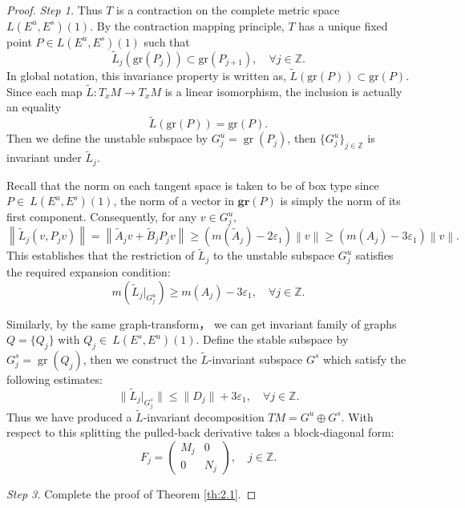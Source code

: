 \documentclass[12pt]{article}
\begin{document}
\begin{proof}{\em Step 1.}
	Thus $ T $ is a contraction on the complete metric space $ L(E^{u},E^{s})(1) $. By the contraction mapping principle, $ T $ has a unique fixed point $ P\in L(E^{u},E^{s})(1) $  such that
	$$
	\widetilde{L}_{j}(\text{gr}(P_{j}))\subset \text{gr}(P_{j+1}), \quad \forall j\in \mathbb Z.
	$$
	In global notation, this invariance property is written as, $ \widetilde{L}(\text{gr}(P))\subset \text{gr}(P) $. Since each map $ \widetilde{L}:T_{x}M \rightarrow T_{x}M $ is a linear isomorphism,
	the inclusion is actually an equality
	$$
	\widetilde{L}(\text{gr}(P))= \text{gr}(P).
	$$
	Then we define the unstable subspace by $G_j^u = \operatorname{gr}(P_j)$, then $ \{G_j^{u}\}_{j\in \mathbb Z} $ is invariant under $ \widetilde{L}_{j} $.
	
	Recall that the norm on each tangent space is taken to be of box type since  $ P\in\ L(E^{u},E^{s})(1) $, the norm of a vector in $ \textbf{gr}(P) $ is simply the norm of its first component. Consequently, for any $ v\in G_{j}^{u}  ,$
	$$
	\left\|\widetilde{L}_{j}(v,P_{j}v)\right\|=\left\|\widetilde{A}_{j}v+\widetilde{B}_{j}P_{j}v\right\|\geqslant (m(\widetilde{A}_{j})- 2\varepsilon_1 ) \left\|v\right\|\geqslant (m(A_{j})- 3\varepsilon_1 ) \left\|v\right\|.
	$$
	This establishes that the restriction of $ \widetilde{L}_{j} $ to the unstable subspace $G_{j}^u$ satisfies the required expansion condition:
	$$
	m(\widetilde{L}_{j}|_{G_{j}^{u}})\geqslant m(A_{j})- 3\varepsilon_1, \quad \forall j \in \mathbb{Z}.
	$$
	
	Similarly, by the same graph‑transform， we can get invariant family of graphs $ Q=\{Q_j\} $ with $ Q_j\in\ L(E^{s},E^{u})(1) $. Define the stable subspace by $ G_j^s = \operatorname{gr}(Q_j)$, then we construct the $\widetilde{L}$-invariant subspace $G^s$ which satisfy the following estimates:$$ \|\widetilde{L}_j|_{G^s_j}\| \leqslant \|D_{j}\| + 3\varepsilon_1, \quad \forall j \in \mathbb{Z} .$$ Thus we have produced a $\widetilde{L}$-invariant decomposition $T     M = G^u \oplus G^s$. With respect to this splitting the pulled‑back derivative takes a block‑diagonal form:
	$$
	F_{j}=\begin{pmatrix}
		M_{j}&0\\
		0&N_{j}
	\end{pmatrix},\quad j\in\mathbb{Z}.
	$$ 
	
	{\em Step 3.} Complete the proof of
	Theorem \ref{th:2.1}. 
	

\end{proof}
\end{document}

